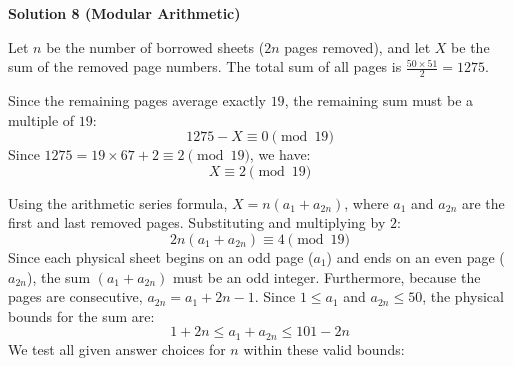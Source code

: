 \begin{enumerate}
 



\textbf{Solution 8 (Modular Arithmetic)}

Let $n$ be the number of borrowed sheets ($2n$ pages removed), and let $X$ be the sum of the removed page numbers. The total sum of all pages is $\frac{50 \times 51}{2} = 1275$.

 Since the remaining pages average exactly $19$, the remaining sum must be a multiple of $19$:
 \[1275 - X \equiv 0 \pmod{19}\]Since $1275 = 19 \times 67 + 2 \equiv 2 \pmod{19}$, we have:
 \[X \equiv 2 \pmod{19}\]

 Using the arithmetic series formula, $X = n(a_1 + a_{2n})$, where $a_1$ and $a_{2n}$ are the first and last removed pages. Substituting and multiplying by $2$:
 \[2n(a_1 + a_{2n}) \equiv 4 \pmod{19}\]Since each physical sheet begins on an odd page ($a_1$) and ends on an even page ($a_{2n}$), the sum $(a_1 + a_{2n})$ must be an odd integer. Furthermore, because the pages are consecutive, $a_{2n} = a_1 + 2n - 1$. Since $1 \le a_1$ and $a_{2n} \le 50$, the physical bounds for the sum are:
 \[1 + 2n \le a_1 + a_{2n} \le 101 - 2n\]We test all given answer choices for $n$ within these valid bounds:


\end{enumerate}
